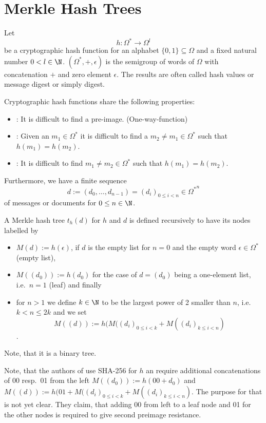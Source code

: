 \section{Merkle Hash Trees}

Let \[h: \Omega^\ast \rightarrow \Omega^l\]
be a cryptographic hash function for an alphabet \(\{0,1\} \subseteq \Omega\) %
and a fixed natural number \(0 < l \in \N\).
\((\Omega^\ast, +, \epsilon)\) is the semigroup of words of
\(\Omega\) with concatenation \(+\) and zero element \(\epsilon\).
The results are often called hash values or message digest or
simply digest.

Cryptographic hash functions share the following properties:
\begin{itemize}
\item {}: It is difficult to find a
pre-image. (One-way-function)
\item {}: Given an \(m_1 \in \Omega^\ast\)
it is difficult to find a \(m_2 \ne m_1 \in   \Omega^\ast\) such that
\(h(m_1) = h(m_2)\).
\item {}: It is difficult to find \(m_1 \ne m_2 \in   \Omega^\ast\)
such that \(h(m_1) = h(m_2)\).
\end{itemize}
Furthermore, we have a finite sequence 
\[d := (d_0,\ldots,d_{n-1}) = (d_i)_{0 \le i < n} \in {\Omega^\ast}^n\]
of messages or documents
for \(0 \le n \in \N\).

\begin{definition}
A Merkle hash tree \(t_h(d)\) for \(h\) and \(d\) is defined recursively to 
have its nodes labelled by
\begin{itemize}
\item \(M(d) := h(\epsilon)\), if \(d\) is the empty list for \(n=0\)
and the empty word \(\epsilon \in \Omega^\ast\) (empty list),
\item \(M((d_0)) := h(d_0)\) for the case of \(d = (d_0)\) being a one-element
list, i.e.\ \(n = 1\) (leaf) and finally
\item for \(n > 1\) we define \(k \in \N\) to 
be the largest power of 2 smaller than \(n\), i.e.
\(k < n \le 2k\) and we set
\[M((d)) := h(M((d_i)_{0 \le i < k}+M( (d_i)_{k \le i < n})\].
\end{itemize}
Note, that it is a binary tree.
\end{definition}
Note, that the authors of \cite{LLK2013} use SHA-256 for \(h\) an require
additional concatenations of 00 resp.\ 01 from the left \(M((d_0)) := h(00+d_0)\) and
\(M((d)) := h(01+M((d_i)_{0 \le i < k}+M( (d_i)_{k \le i < n})\). The purpose
for that is not yet clear. They claim, that adding 00 from left to a leaf node
and 01 for the other nodes is required to give second preimage resistance.
 
